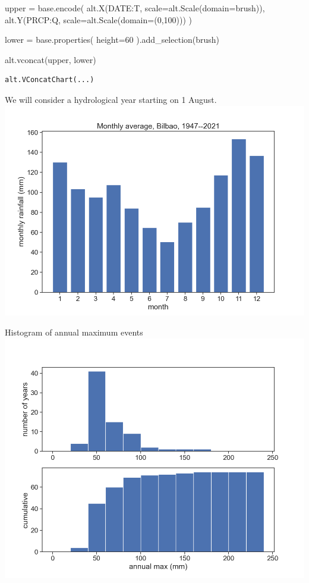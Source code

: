 \documentclass[
  letterpaper,
  DIV=11,
  numbers=noendperiod]{scrreprt}
\newenvironment{Shaded}{\begin{snugshade}}{\end{snugshade}}
\newcommand{\DecValTok}[1]{\textcolor[rgb]{0.68,0.00,0.00}{#1}}
\newcommand{\NormalTok}[1]{\textcolor[rgb]{0.00,0.23,0.31}{#1}}
\newcommand{\OperatorTok}[1]{\textcolor[rgb]{0.37,0.37,0.37}{#1}}
\newcommand{\StringTok}[1]{\textcolor[rgb]{0.13,0.47,0.30}{#1}}
\begin{document}
\begin{Shaded}
\begin{Highlighting}[]
\NormalTok{upper }\OperatorTok{=}\NormalTok{ base.encode(}
\NormalTok{    alt.X(}\StringTok{\textquotesingle{}DATE:T\textquotesingle{}}\NormalTok{, scale}\OperatorTok{=}\NormalTok{alt.Scale(domain}\OperatorTok{=}\NormalTok{brush)),}
\NormalTok{    alt.Y(}\StringTok{\textquotesingle{}PRCP:Q\textquotesingle{}}\NormalTok{, scale}\OperatorTok{=}\NormalTok{alt.Scale(domain}\OperatorTok{=}\NormalTok{(}\DecValTok{0}\NormalTok{,}\DecValTok{100}\NormalTok{)))}
\NormalTok{)}

\NormalTok{lower }\OperatorTok{=}\NormalTok{ base.properties(}
\NormalTok{    height}\OperatorTok{=}\DecValTok{60}
\NormalTok{).add\_selection(brush)}

\NormalTok{alt.vconcat(upper, lower)}
\end{Highlighting}
\end{Shaded}

\begin{verbatim}
alt.VConcatChart(...)
\end{verbatim}

We will consider a hydrological year starting on 1 August.
\includegraphics{archive/figures/monthly_average_bilbao.png}

Histogram of annual maximum events
\includegraphics{archive/figures/hist_count_cumulative_bilbao.png}
\end{document}
